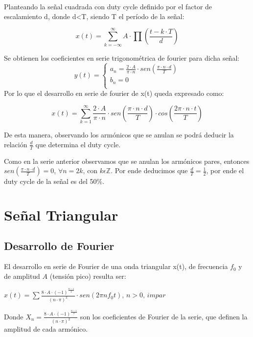 \documentclass[../../labo_tp5_main.tex]{subfiles}
\begin{document}
Planteando la señal cuadrada con duty cycle definido por el factor de escalamiento d, donde d<T, siendo T el período de la señal:\par
\begin{center}
$$x(t) = \sum_{k = -\infty}^{\infty}A\cdot\prod(\frac{t-k\cdot T}{d})$$
\end{center}
Se obtienen los coeficientes en serie trigonométrica de fourier para dicha señal:
	 \begin{equation}
  	   y(t) = \left\{
	  	    \begin{array}{ll}
		 					a_n = \frac{2\cdot A}{\pi\cdot n}\cdot sen(\frac{\pi\cdot n\cdot d}{T}) \\
			 				b_n = 0 \\
	     	 \end{array}
	     	\right.
 	\end{equation}
Por lo que el desarrollo en serie de fourier de x(t) queda expresado como:\par
\begin{center}
$$x(t) = \sum_{k = 1}^{\infty}\frac{2\cdot A}{\pi\cdot n}\cdot sen(\frac{\pi\cdot n\cdot d}{T})\cdot cos(\frac{2\pi\cdot n\cdot t}{T})$$
\end{center}
De esta manera, observando los armónicos que se anulan se podrá deducir la relación $\frac{d}{T}$ que determina el duty cycle.\par
Como en la serie anterior observamos que se anulan los armónicos pares, entonces $sen(\frac{\pi\cdot n\cdot d}{T}) = 0$, $\forall n = 2k$, con $k \epsilon \mathbb{Z}$. Por ende deducimos que $\frac{d}{T} = \frac{1}{2}$, por ende el duty cycle de la señal es del 50\%.

\section{Señal Triangular}
\subsection{Desarrollo de Fourier}
El desarrollo en serie de Fourier de una onda triangular x(t), de frecuencia $f_0$ y de amplitud $A$ (tensión pico) resulta ser: \par
\begin{center}
$x(t) = \sum\frac{8\cdot A\cdot (-1)^\frac{n-1}{2}}{(n\cdot\pi)^2}\cdot sen(2\pi nf_{0}t),\,n>0,\,impar$
\end{center}
Donde $X_n = \frac{8\cdot A\cdot (-1)^\frac{n-1}{2}}{(n\cdot\pi)^2}$ son los coeficientes de Fourier de la serie, que definen la amplitud de cada armónico.\par
\end{document}
